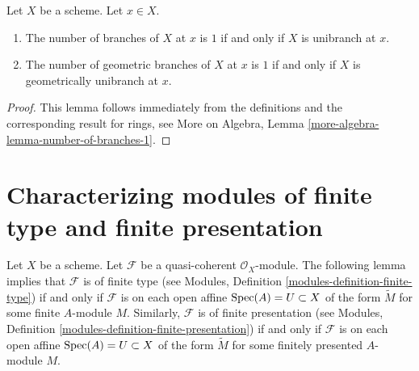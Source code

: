 \begin{lemma}
\label{lemma-number-of-branches-1}
Let $X$ be a scheme. Let $x \in X$.
\begin{enumerate}
\item The number of branches of $X$ at $x$ is $1$ if and only if
$X$ is unibranch at $x$.
\item The number of geometric branches of $X$ at $x$ is $1$ if and only if
$X$ is geometrically unibranch at $x$.
\end{enumerate}
\end{lemma}

\begin{proof}
This lemma follows immediately from the definitions and the corresponding
result for rings, see More on Algebra, Lemma
\ref{more-algebra-lemma-number-of-branches-1}.
\end{proof}






\section{Characterizing modules of finite type and finite presentation}
\label{section-characterizing-finite-type-presentation}

\noindent
Let $X$ be a scheme.
Let $\mathcal{F}$ be a quasi-coherent $\mathcal{O}_X$-module.
The following lemma implies that $\mathcal{F}$ is of finite type
(see Modules, Definition \ref{modules-definition-finite-type})
if and only if $\mathcal{F}$ is
on each open affine $\mathop{\mathrm{Spec}}(A) = U \subset X$
of the form $\widetilde M$ for some finite $A$-module $M$.
Similarly, $\mathcal{F}$ is of finite presentation
(see Modules, Definition \ref{modules-definition-finite-presentation})
if and only if $\mathcal{F}$ is
on each open affine $\mathop{\mathrm{Spec}}(A) = U \subset X$
of the form $\widetilde M$ for some finitely presented $A$-module $M$.

